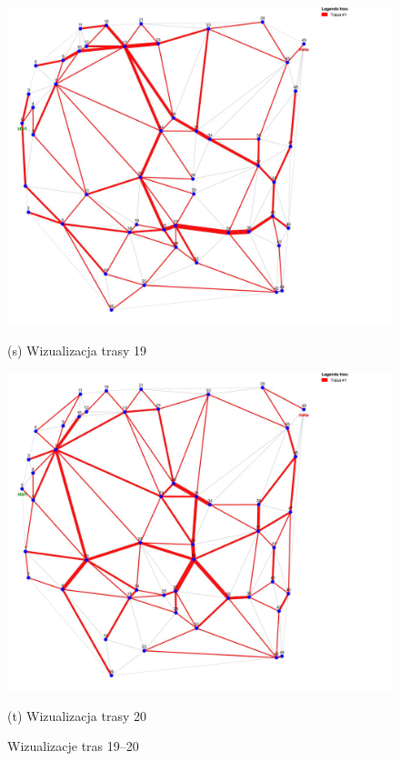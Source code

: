 \documentclass{article}
\begin{document}
\clearpage


\begin{figure}[H]
    \centering
    \begin{minipage}[b]{0.48\linewidth}
        \includegraphics[width=\linewidth]{19.png}
        \caption*{(s) Wizualizacja trasy 19}
    \end{minipage}
    \hfill
    \begin{minipage}[b]{0.48\linewidth}
        \includegraphics[width=\linewidth]{20.png}
        \caption*{(t) Wizualizacja trasy 20}
    \end{minipage}

    \caption{Wizualizacje tras 19–20}
    \label{fig:routes-19-20}
\end{figure}
\end{document}
